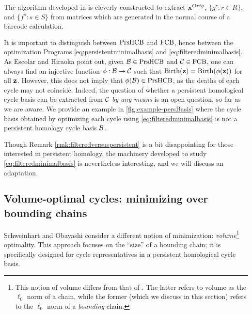  

The algorithm developed in \cite{Escolar2016} is cleverly constructed to extract $\mathbf{x}^{Orig}$, $\{g^r : r \in R\}$, and $\{f^s : s \in S\}$ from matrices which are generated in the normal course of a barcode calculation.


\begin{remark}
\label{rmk:filteredversuspersistent}
It is important to distinguish between  $\mathrm{PrsHCB}$ and $\mathrm{FCB}$, hence between the optimization Programs \eqref{eq:persistentminimalbasis} and \eqref{eq:filteredminimalbasis}.  As Escolar and Hiraoka \cite{Escolar2016} point out, given $\mathcal B \in \mathrm{PrsHCB}$ and $\mathcal{C} \in \mathrm{FCB}$, one can always find an injective function $\phi: \mathcal B \to \mathcal{C}$ such that $\mathrm{Birth}({\mathbf z}) = \mathrm{Birth}(\phi({\mathbf z}))$ for all ${\mathbf z}$.  However, this does not imply that $\phi(\mathcal B) \in \mathrm{PrsHCB}$, as the deaths of each cycle may not coincide.  Indeed, the question of whether a persistent homological cycle basis can be extracted from $\mathcal{C}$ \emph{by any means} is an open question, so far as we are aware. We provide an example in \fig \ref{fig:example-persBasis} where the cycle basis obtained by optimizing each cycle using \pr \eqref{eq:filteredminimalbasis} is not a persistent homology cycle basis $\mathcal B$. 
\end{remark} 


Though Remark \ref{rmk:filteredversuspersistent} is a bit disappointing for those interested in persistent homology, the machinery developed to study \pr \eqref{eq:filteredminimalbasis} is nevertheless interesting, and we will discuss an adaptation.


\subsection{Volume-optimal cycles: minimizing over bounding chains}\label{sec:volume}

Schweinhart \cite{schweinhart2015statistical} and  Obayashi \cite{Obayashi2018} consider a different notion of minimization: \emph{volume}\footnote{This notion of volume differs from that of \cite{chenhardness}. The latter refers to volume as the $\ell_0$ norm of a chain, while the former (which we discuss in this section) refers to the $\ell_0$ norm of a \emph{bounding} chain.} optimality.  This approach focuses on the ``size'' of a bounding chain; it is specifically designed for cycle representatives in a persistent homological cycle basis.    


